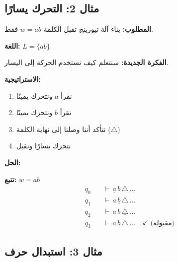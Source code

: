 \documentclass[14pt]{extarticle}
\begin{document}
\clearpage

\subsection{مثال 2: التحرك يسارًا}

\textbf{المطلوب:} بناء آلة تيورينج تقبل الكلمة $w = ab$ فقط.

\textbf{اللغة:} $L = \{ab\}$

\textbf{الفكرة الجديدة:} سنتعلم كيف نستخدم الحركة إلى اليسار.

\textbf{الاستراتيجية:}
\begin{enumerate}
    \item نقرأ $a$ ونتحرك يمينًا
    \item نقرأ $b$ ونتحرك يمينًا
    \item نتأكد أننا وصلنا إلى نهاية الكلمة ($\triangle$)
    \item نتحرك يسارًا ونقبل
\end{enumerate}

\textbf{الحل:}

\begin{center}
\end{center}

\textbf{تتبع:} $w = ab$
\begin{align*}
q_0 \quad &\vdash \, \underline{a} \, b \, \triangle \, \ldots \\
q_1 \quad &\vdash \, a \, \underline{b} \, \triangle \, \ldots \\
q_2 \quad &\vdash \, a \, b \, \underline{\triangle} \, \ldots \\
q_3 \quad &\vdash \, a \, \underline{b} \, \triangle \, \ldots \quad \checkmark \text{ (مقبولة)}
\end{align*}

\clearpage

\subsection{مثال 3: استبدال حرف}
\end{document}
